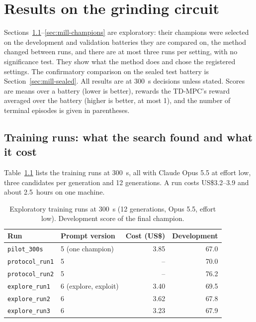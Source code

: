 \chapter{Results on the grinding circuit}
\label{ch:mill-results}
Sections~\ref{sec:mill-runs}--\ref{sec:mill-champions} are exploratory: their
champions were selected on the development and validation batteries they are
compared on, the method changed between runs, and there are at most three runs
per setting, with no significance test. They show what the method does and
chose the registered settings. The confirmatory comparison on the sealed test
battery is Section~\ref{sec:mill-sealed}. All results are at 300~s decisions
unless stated. Scores are means over a battery (lower is better), rewards the
TD-MPC's reward averaged over the battery (higher is better, at most 1), and
the number of terminal episodes is given in parentheses.

\section{Training runs: what the search found and what it cost}
\label{sec:mill-runs}
Table~\ref{tab:mill-runs} lists the training runs at 300~s, all with Claude
Opus 5.5 at effort low, three candidates per generation and 12 generations.
A run costs US\$3.2--3.9 and about 2.5~hours on one machine.

\begin{table}[tb]
  \centering
  \caption{Exploratory training runs at 300~s (12 generations, Opus 5.5,
    effort low). Development score of the final champion.}
  \label{tab:mill-runs}
  \small
  \begin{tabular}{@{}llrr@{}}
    \toprule
    Run & Prompt version & Cost (US\$) & Development \\
    \midrule
    \texttt{pilot\_300s}     & 5 (one champion) & 3.85 & 67.0 \\
    \texttt{protocol\_run1}  & 5 & -- & 70.0 \\
    \texttt{protocol\_run2}  & 5 & -- & 76.2 \\
    \texttt{explore\_run1}   & 6 (explore, exploit) & 3.40 & 69.5 \\
    \texttt{explore\_run2}   & 6 & 3.62 & 67.8 \\
    \texttt{explore\_run3}   & 6 & 3.23 & 67.9 \\
    \bottomrule
  \end{tabular}
\end{table}

